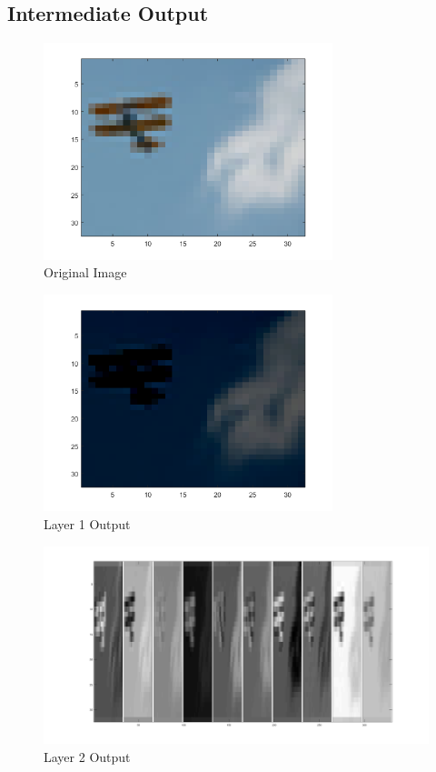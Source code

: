\documentclass[11pt,english]{article}
\begin{document}
\newpage
\begin{appendices}
\section{Intermediate Output}

\begin{figure}[h!]
  \caption{Original Image}
  \centering
    \includegraphics[width=0.75\textwidth]{layer/0}
\end{figure}

\begin{figure}[h!]
  \caption{Layer 1 Output}
  \centering
    \includegraphics[width=0.75\textwidth]{layer/1}
\end{figure}

\begin{figure}[h!]
  \caption{Layer 2 Output}
  \centering
    \includegraphics[width=\textwidth]{layer/2}
\end{figure}


\end{appendices}
\end{document}

